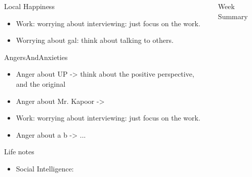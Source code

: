 \documentclass[serif, mathserif, final]{beamer}
\begin{document}
\begin{frame}
\begin{columns}
\begin{column}{0.25\linewidth}
    
      \begin{block}{Local Happiness}
        \begin{itemize} 
          \tiny \item \tiny Work: worrying about interviewing: just focus on the work. 
        \item \tiny Worrying about gal: think about talking to others. 
        \end{itemize}
      \end{block} 

      \begin{block}{AngersAndAnxieties}
        \begin{itemize}
          \tiny \item \tiny Anger about UP -> think about the positive
            perspective, and the original
          \item \tiny Anger about Mr. Kapoor ->  
          \item \tiny Work: worrying about interviewing: just
          focus on the work. 
          \item \tiny Anger about a b  -> ...
        \end{itemize} 
      \end{block}
      \begin{block}{Life notes}
        \begin{itemize}
        \tiny \item \tiny Social Intelligence: 
        \end{itemize}
      \end{block}
\end{column}




\begin{column}{0.5\linewidth} 
      \begin{block}{Week Summary}


\end{block}
\end{column}
\end{columns}
\end{frame}
\end{document}
